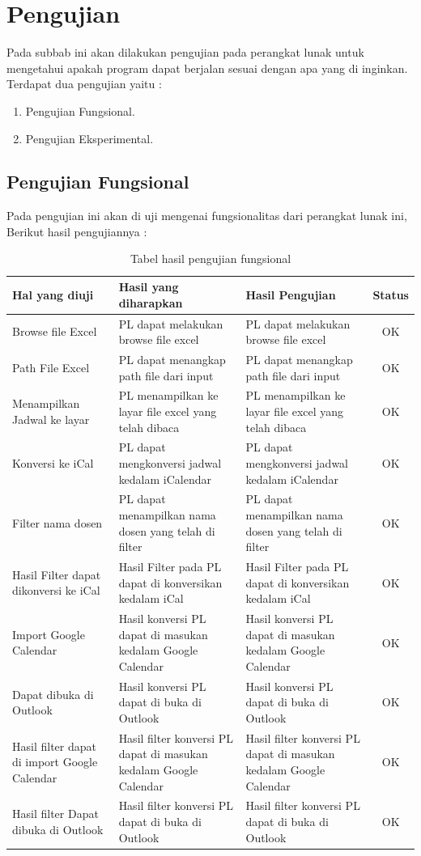 \section{Pengujian}
Pada subbab ini akan dilakukan pengujian pada perangkat lunak untuk mengetahui apakah program dapat berjalan sesuai dengan apa yang di inginkan. Terdapat dua pengujian yaitu :
\begin{enumerate}
	\item Pengujian Fungsional.
	\item Pengujian Eksperimental.
\end{enumerate}

\subsection{Pengujian Fungsional}
Pada pengujian ini akan di uji mengenai fungsionalitas dari perangkat lunak ini, Berikut hasil pengujiannya : 
\begin{table}[H]
	\centering
		\caption{Tabel hasil pengujian fungsional}
		\label{tab:fungsional}
		\begin{tabular}{ | p{4cm} | p{4cm} | p{4cm} | c |}
			\hline
				Hal yang diuji & Hasil yang diharapkan & Hasil Pengujian & Status \\ \hline
				Browse file Excel & PL dapat melakukan browse file excel & PL dapat melakukan browse file excel & OK \\ \hline
				Path File Excel & PL dapat menangkap path file dari input & PL dapat menangkap path file dari input & OK \\ \hline
				Menampilkan Jadwal ke layar & PL menampilkan ke layar file excel yang telah dibaca  & PL menampilkan ke layar file excel yang telah dibaca & OK \\ \hline
				Konversi ke iCal & PL dapat mengkonversi jadwal kedalam iCalendar & PL dapat mengkonversi jadwal kedalam iCalendar & OK \\ \hline
				Filter nama dosen & PL dapat menampilkan nama dosen yang telah di filter & PL dapat menampilkan nama dosen yang telah di filter & OK \\ \hline
				Hasil Filter dapat dikonversi ke iCal & Hasil Filter pada PL dapat di konversikan kedalam iCal & Hasil Filter pada PL dapat di konversikan kedalam iCal & OK \\ \hline
				Import Google Calendar & Hasil konversi PL dapat di masukan kedalam Google Calendar & Hasil konversi PL dapat di masukan kedalam Google Calendar & OK \\ \hline
				Dapat dibuka di Outlook & Hasil konversi PL dapat di buka di Outlook & Hasil konversi PL dapat di buka di Outlook & OK \\ \hline
				Hasil filter dapat di import Google Calendar & Hasil filter konversi PL dapat di masukan kedalam Google Calendar & Hasil filter konversi PL dapat di masukan kedalam Google Calendar & OK \\ \hline
				Hasil filter Dapat dibuka di Outlook & Hasil filter konversi PL dapat di buka di Outlook & Hasil filter konversi PL dapat di buka di Outlook & OK \\ \hline
		\end{tabular}
\end{table}

